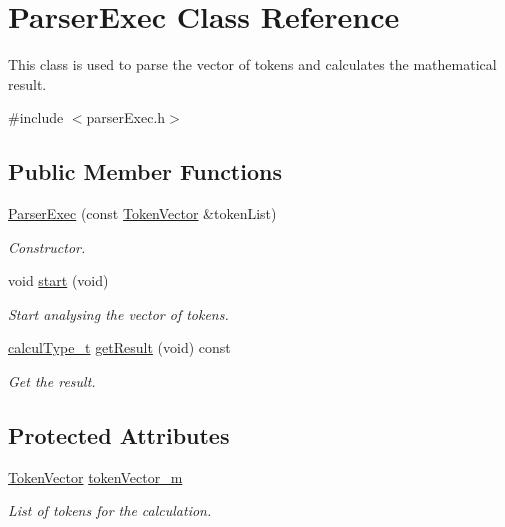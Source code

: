 \hypertarget{class_parser_exec}{}\section{Parser\+Exec Class Reference}
\label{class_parser_exec}


This class is used to parse the vector of tokens and calculates the mathematical result.  




{\ttfamily \#include $<$parser\+Exec.\+h$>$}

\subsection*{Public Member Functions}
\begin{DoxyCompactItemize}
\item 
\hyperlink{class_parser_exec_a865378c0f6a301dd4bffd870512167e2}{Parser\+Exec} (const \hyperlink{token_8h_ab47f31774188c3fad94acfd21e12c917}{Token\+Vector} \&token\+List)
\begin{DoxyCompactList}\small\item\em Constructor. \end{DoxyCompactList}\item 
\hypertarget{class_parser_exec_aa00f3c5f1f4ea46e1c6aafebff8d4e9f}{}void \hyperlink{class_parser_exec_aa00f3c5f1f4ea46e1c6aafebff8d4e9f}{start} (void)\label{class_parser_exec_aa00f3c5f1f4ea46e1c6aafebff8d4e9f}

\begin{DoxyCompactList}\small\item\em Start analysing the vector of tokens. \end{DoxyCompactList}\item 
\hyperlink{mpfr_interface_8h_a16492006127cd422340be2441c22c14b}{calcul\+Type\+\_\+t} \hyperlink{class_parser_exec_a4cb35c20c400f26f8894a743663ce733}{get\+Result} (void) const 
\begin{DoxyCompactList}\small\item\em Get the result. \end{DoxyCompactList}\end{DoxyCompactItemize}
\subsection*{Protected Attributes}
\begin{DoxyCompactItemize}
\item 
\hypertarget{class_parser_exec_a56bfa666d473614fa26a484036897183}{}\hyperlink{token_8h_ab47f31774188c3fad94acfd21e12c917}{Token\+Vector} \hyperlink{class_parser_exec_a56bfa666d473614fa26a484036897183}{token\+Vector\+\_\+m}\label{class_parser_exec_a56bfa666d473614fa26a484036897183}

\begin{DoxyCompactList}\small\item\em List of tokens for the calculation. \end{DoxyCompactList}\end{DoxyCompactItemize}


